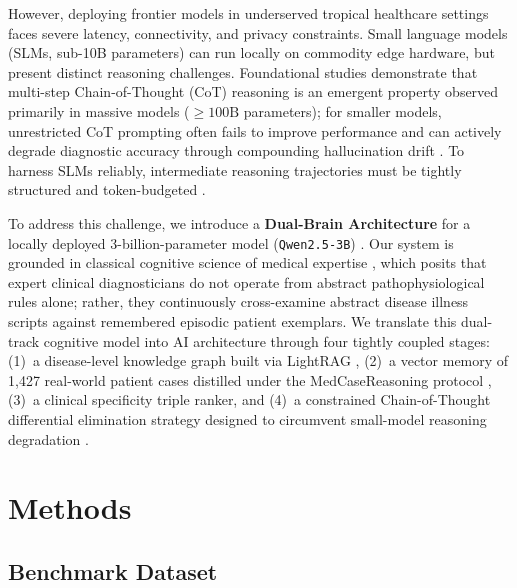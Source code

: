 \documentclass{article}
\begin{document}
However, deploying frontier models in underserved tropical healthcare settings faces severe latency, connectivity, and privacy constraints. Small language models (SLMs, sub-10B parameters) can run locally on commodity edge hardware, but present distinct reasoning challenges. Foundational studies demonstrate that multi-step Chain-of-Thought (CoT) reasoning is an emergent property observed primarily in massive models ($\ge 100\text{B}$ parameters); for smaller models, unrestricted CoT prompting often fails to improve performance and can actively degrade diagnostic accuracy through compounding hallucination drift \citep{wei2022chain,fu2023specializing,li2025small}. To harness SLMs reliably, intermediate reasoning trajectories must be tightly structured and token-budgeted \citep{renze2024benefits}.

To address this challenge, we introduce a \textbf{Dual-Brain Architecture} for a locally deployed 3-billion-parameter model (\texttt{Qwen2.5-3B}) \citep{qwen2024}. Our system is grounded in classical cognitive science of medical expertise \citep{schmidt1990cognitive,croskerry2009universal,bowen2006educational}, which posits that expert clinical diagnosticians do not operate from abstract pathophysiological rules alone; rather, they continuously cross-examine abstract disease illness scripts against remembered episodic patient exemplars. We translate this dual-track cognitive model into AI architecture through four tightly coupled stages: (1)~a disease-level knowledge graph built via LightRAG \citep{gao2023lightrag}, (2)~a vector memory of 1,427 real-world patient cases distilled under the MedCaseReasoning protocol \citep{wu2025medcasereasoning}, (3)~a clinical specificity triple ranker, and (4)~a constrained Chain-of-Thought differential elimination strategy designed to circumvent small-model reasoning degradation \citep{renze2024benefits}.

\section{Methods}

\subsection{Benchmark Dataset}
\end{document}
